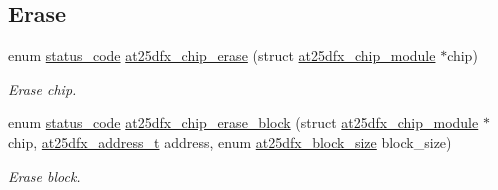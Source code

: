 \subsection*{Erase}
\begin{DoxyCompactItemize}
\item 
enum \mbox{\hyperlink{group__group__sam0__utils__status__codes_ga751c892e5a46b8e7d282085a5a5bf151}{status\+\_\+code}} \mbox{\hyperlink{group__asfdoc__common2__at25dfx__group_gae996a3088d79878787756de3a53f7651}{at25dfx\+\_\+chip\+\_\+erase}} (struct \mbox{\hyperlink{structat25dfx__chip__module}{at25dfx\+\_\+chip\+\_\+module}} $\ast$chip)
\begin{DoxyCompactList}\small\item\em Erase chip. \end{DoxyCompactList}\item 
enum \mbox{\hyperlink{group__group__sam0__utils__status__codes_ga751c892e5a46b8e7d282085a5a5bf151}{status\+\_\+code}} \mbox{\hyperlink{group__asfdoc__common2__at25dfx__group_gacb524f227dc6a286a4a6d5f2d19aed1f}{at25dfx\+\_\+chip\+\_\+erase\+\_\+block}} (struct \mbox{\hyperlink{structat25dfx__chip__module}{at25dfx\+\_\+chip\+\_\+module}} $\ast$chip, \mbox{\hyperlink{group__asfdoc__common2__at25dfx__group_ga6797a814b041014cef23de480c9da9ef}{at25dfx\+\_\+address\+\_\+t}} address, enum \mbox{\hyperlink{group__asfdoc__common2__at25dfx__group_ga1b6ad4d489afc2892947e731f9be059b}{at25dfx\+\_\+block\+\_\+size}} block\+\_\+size)
\begin{DoxyCompactList}\small\item\em Erase block. \end{DoxyCompactList}\end{DoxyCompactItemize}
